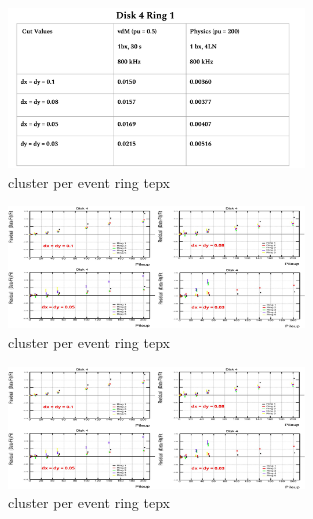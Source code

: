 \begin{figure}[!htp]
\centering
\includegraphics[width=0.7\textwidth]{ashish_thesis/stat_prec_d4r1.png}
\caption{%
  cluster per event ring tepx 
}
\label{fig:cluster_ring}
\end{figure}





\begin{figure}[!htp]
\centering
\includegraphics[width=0.7\textwidth]{ashish_thesis/cut_optimization_twofold.png}
\caption{%
  cluster per event ring tepx 
}
\label{fig:cluster_ring}
\end{figure}



\begin{figure}[!htp]
\centering
\includegraphics[width=0.7\textwidth]{ashish_thesis/cut_optimization_twofold.png}
\caption{%
  cluster per event ring tepx 
}
\label{fig:cluster_ring}
\end{figure}




